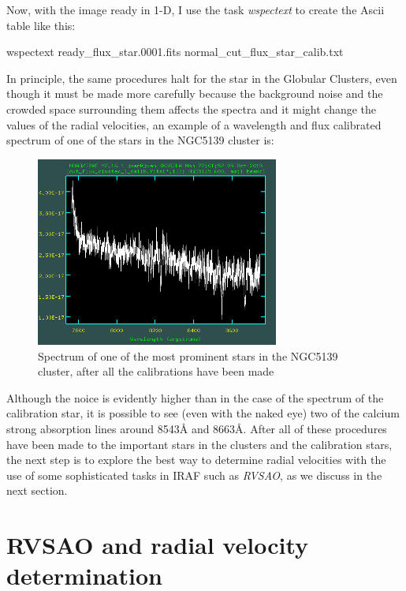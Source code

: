 Now, with the image ready in 1-D, I use the task \textit{wspectext} to create the Ascii table like this:

\begin{center}
wspectext ready\_flux\_star.0001.fits normal\_cut\_flux\_star\_calib.txt
\end{center}

In principle, the same procedures halt for the star in the Globular Clusters, even though it must be made more carefully because the background noise and the crowded space surrounding them affects the spectra and it might change the values of the radial velocities, an example of a wavelength and flux calibrated spectrum of one of the stars in the NGC5139 cluster is:

\begin{figure}[H]
\centering
\includegraphics[width=8cm]{images/cluster_star_flux.png}
\caption{Spectrum of one of the most prominent stars in the NGC5139 cluster, after all the calibrations have been made}
\end{figure}

Although the noice is evidently higher than in the case of the spectrum of the calibration star, it is possible to see (even with the naked eye) two of the calcium strong absorption lines around 8543\AA$ $ and 8663\AA. After all of these procedures have been made to the important stars in the clusters and the calibration stars, the next step is to explore the best way to determine radial velocities with the use of some sophisticated tasks in IRAF such as \textit{RVSAO}, as we discuss in the next section. 

\section{RVSAO and radial velocity determination}
